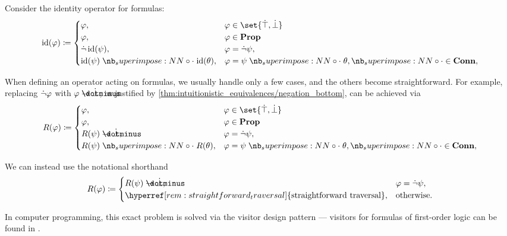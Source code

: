 \begin{remark}\label{rem:straightforward_traversal}
  Consider the identity operator for formulas:
  \begin{equation*}
    \begin{aligned}
      \id(\varphi) \coloneqq \begin{cases}
        \varphi,                        &\varphi \in \set{ \syntop, \synbot } \\
        \varphi,                        &\varphi \in \op*{Prop} \\
        \synneg \id(\psi),              &\varphi = \synneg \psi, \\
        \id(\psi) \syncirc \id(\theta), &\varphi = \psi \syncirc \theta, {\syncirc} \in \op*{Conn}, \\
      \end{cases}
    \end{aligned}
  \end{equation*}

  When defining an operator acting on formulas, we usually handle only a few cases, and the others become straightforward. For example, replacing \( \dot{\neg} \varphi \) with \( \varphi \synimplies \synbot \), as justified by \cref{thm:intuitionistic_equivalences/negation_bottom}, can be achieved via
  \begin{equation*}
    \begin{aligned}
      R(\varphi) \coloneqq \begin{cases}
        \varphi,                     &\varphi \in \set{ \syntop, \synbot } \\
        \varphi,                     &\varphi \in \op*{Prop} \\
        R(\psi) \synimplies \synbot, &\varphi = \synneg \psi, \\
        R(\psi) \syncirc R(\theta),  &\varphi = \psi \syncirc \theta, {\syncirc} \in \op*{Conn}, \\
      \end{cases}
    \end{aligned}
  \end{equation*}

  We can instead use the notational shorthand
  \begin{equation*}
    \begin{aligned}
      R(\varphi) \coloneqq \begin{cases}
        R(\psi) \synimplies \synbot,                                             &\varphi = \synneg \psi, \\
        \hyperref[rem:straightforward_traversal]{\T{straightforward traversal}}, &\T{otherwise.}
      \end{cases}
    \end{aligned}
  \end{equation*}

  In computer programming, this exact problem is solved via the visitor design pattern --- visitors for formulas of first-order logic can be found in \cite{notebook:code}.
\end{remark}


